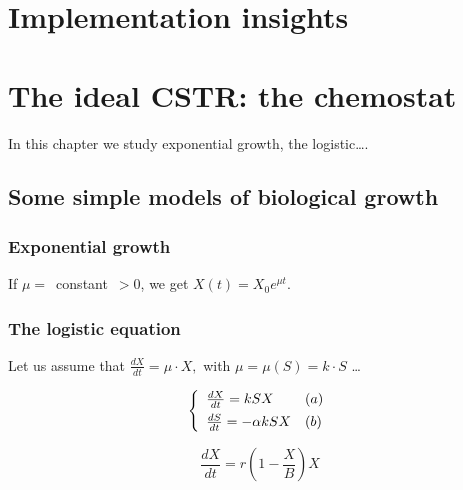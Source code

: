 \documentclass[a4paper, 10pt, twoside, openright]{book}
\begin{document}
\fi



\chapter{Implementation insights}
\chapter{The ideal CSTR: the chemostat}

\textsf{%
In this chapter we study exponential growth, the logistic\ldots .}

\section{Some simple models of biological growth}

\subsection{Exponential growth}

If \mbox{$\mu =$ constant $>0$,} we get $X(t)={X}_0
{e}^{\mu t}$.

\subsection{The logistic equation}

Let us assume that $\frac{dX}{dt}=\mu \cdot X,$ with
$\mu=\mu(S)=k\cdot S$ \ldots 

\begin{displaymath}
\left\{ \begin{array}{ll}
\frac{dX}{dt}=kSX                            & (a) \\
\frac{dS}{dt}=- \alpha kSX \rule{0pt}{3ex}   & (b) 
\end{array}\right.
\end{displaymath}

\begin{equation} \label{logistic}
\frac{dX}{dt}= r(1- \frac{X}{B})X  
\end{equation}
\end{document}

